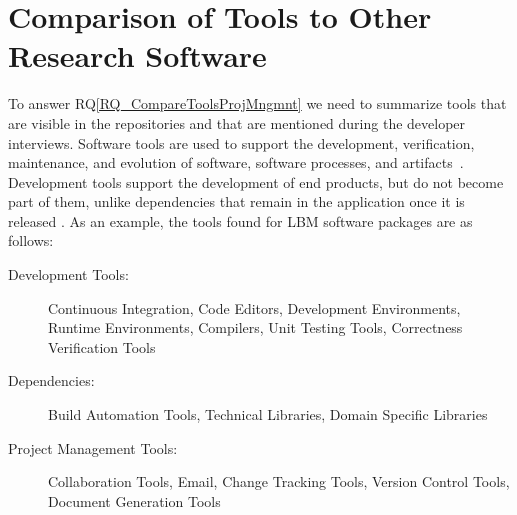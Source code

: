 \documentclass[runningheads]{llncs}
\newcommand{\rqref}[1]{RQ\ref{#1}}
\begin{document}

\section{Comparison of Tools to Other Research Software}
\label{Sec_CompareTools}

To answer \rqref{RQ_CompareToolsProjMngmnt} we need to summarize tools that are
visible in the repositories and that are mentioned during the developer
interviews. Software tools are used to support the development, verification,
maintenance, and evolution of software, software processes, and
artifacts~\cite[p.\ 501]{GhezziEtAl2003}. Development tools support the
development of end products, but do not become part of them, unlike dependencies
that remain in the application once it is released \cite[p.\
506]{GhezziEtAl2003}. As an example, the tools found for LBM software packages
are as follows:

\begin{description}
	\item[Development Tools:] Continuous Integration, Code Editors, Development
	Environments, Runtime Environments, Compilers, Unit Testing Tools,
	Correctness Verification Tools
	\item[Dependencies:] Build Automation Tools, Technical Libraries, Domain
	Specific Libraries
	\item[Project Management Tools:] Collaboration Tools, Email, Change Tracking
	Tools, Version Control Tools, Document Generation Tools
\end{description}
\end{document}
